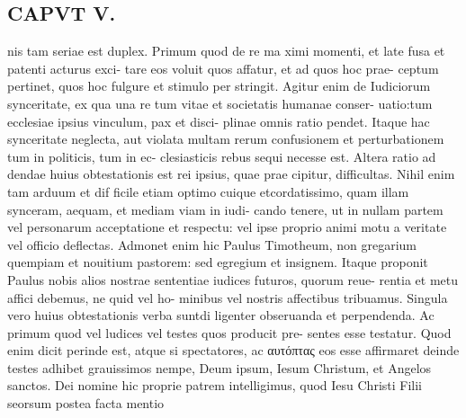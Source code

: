 \documentclass{article}
\begin{document}
\begin{pages}
\section*{CAPVT V. }
\marginpar{[ p.329 ]}nis tam seriae est duplex. Primum quod de re ma ximi momenti, et late fusa et patenti acturus exci- tare eos voluit quos affatur, et ad quos hoc prae- ceptum pertinet, quos hoc fulgure et stimulo per stringit. Agitur enim de Iudiciorum synceritate, ex qua una re tum vitae et societatis humanae conser- uatio:tum ecclesiae ipsius vinculum, pax et disci- plinae omnis ratio pendet. Itaque hac synceritate neglecta, aut violata multam rerum confusionem et perturbationem tum in politicis, tum in ec- clesiasticis rebus sequi necesse est. Altera ratio ad dendae huius obtestationis est rei ipsius, quae prae cipitur, difficultas. Nihil enim tam arduum et dif ficile etiam optimo cuique etcordatissimo, quam illam synceram, aequam, et mediam viam in iudi- cando tenere, ut in nullam partem vel personarum acceptatione et respectu: vel ipse proprio animi motu a veritate vel officio deflectas. Admonet enim hic Paulus Timotheum, non gregarium quempiam et nouitium pastorem: sed egregium et insignem. Itaque proponit Paulus nobis alios nostrae sententiae iudices futuros, quorum reue- rentia et metu affici debemus, ne quid vel ho- minibus vel nostris affectibus tribuamus. Singula vero huius obtestationis verba suntdi ligenter obseruanda et perpendenda. Ac primum quod vel ludices vel testes quos producit pre- sentes esse testatur. Quod enim dicit perinde est, atque si spectatores, ac αυτόπτας eos esse affirmaret deinde testes adhibet grauissimos nempe, Deum ipsum, Iesum Christum, et Angelos sanctos. Dei nomine hic proprie patrem intelligimus, quod Iesu Christi Filii seorsum postea facta mentio 

\end{pages}
\end{document}
